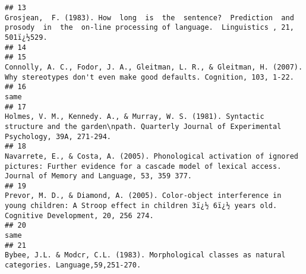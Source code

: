 \documentclass[
  english,
  man]{apa6}
\begin{document}
\begin{verbatim}
## 13                                                                                                                                                                Grosjean,  F. (1983). How  long  is  the  sentence?  Prediction  and  prosody  in  the  on-line processing of language.  Linguistics , 21, 501ï¿½529.
## 14                                                                                                                                                                                                                                                                                                                     
## 15                                                                                                                                                                          Connolly, A. C., Fodor, J. A., Gleitman, L. R., & Gleitman, H. (2007). Why stereotypes don't even make good defaults. Cognition, 103, 1-22.
## 16                                                                                                                                                                                                                                                                                                                 same
## 17                                                                                                                                                            Holmes, V. M., Kennedy. A., & Murray, W. S. (1981). Syntactic structure and the garden\npath. Quarterly Journal of Experimental Psychology, 39A, 271-294.
## 18                                                                                                                                 Navarrete, E., & Costa, A. (2005). Phonological activation of ignored pictures: Further evidence for a cascade model of lexical access. Journal of Memory and Language, 53, 359 377.
## 19                                                                                                                                               Prevor, M. D., & Diamond, A. (2005). Color-object interference in young children: A Stroop effect in children 3ï¿½ 6ï¿½ years old. Cognitive Development, 20, 256 274.
## 20                                                                                                                                                                                                                                                                                                                 same
## 21                                                                                                                                                                                                                  Bybee, J.L. & Modcr, C.L. (1983). Morphological classes as natural categories. Language,59,251-270.

\end{verbatim}
\end{document}
